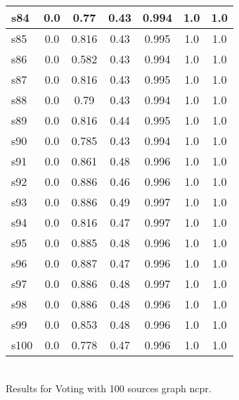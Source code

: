\documentclass{article}
\begin{document}
\begin{tabular}{|l|c|c|c|c|c|c|}
\hline
s84 &0.0 & 0.77 & 0.43 & 0.994 & 1.0 & 1.0\\
\hline
s85 &0.0 & 0.816 & 0.43 & 0.995 & 1.0 & 1.0\\
\hline
s86 &0.0 & 0.582 & 0.43 & 0.994 & 1.0 & 1.0\\
\hline
s87 &0.0 & 0.816 & 0.43 & 0.995 & 1.0 & 1.0\\
\hline
s88 &0.0 & 0.79 & 0.43 & 0.994 & 1.0 & 1.0\\
\hline
s89 &0.0 & 0.816 & 0.44 & 0.995 & 1.0 & 1.0\\
\hline
s90 &0.0 & 0.785 & 0.43 & 0.994 & 1.0 & 1.0\\
\hline
s91 &0.0 & 0.861 & 0.48 & 0.996 & 1.0 & 1.0\\
\hline
s92 &0.0 & 0.886 & 0.46 & 0.996 & 1.0 & 1.0\\
\hline
s93 &0.0 & 0.886 & 0.49 & 0.997 & 1.0 & 1.0\\
\hline
s94 &0.0 & 0.816 & 0.47 & 0.997 & 1.0 & 1.0\\
\hline
s95 &0.0 & 0.885 & 0.48 & 0.996 & 1.0 & 1.0\\
\hline
s96 &0.0 & 0.887 & 0.47 & 0.996 & 1.0 & 1.0\\
\hline
s97 &0.0 & 0.886 & 0.48 & 0.997 & 1.0 & 1.0\\
\hline
s98 &0.0 & 0.886 & 0.48 & 0.996 & 1.0 & 1.0\\
\hline
s99 &0.0 & 0.853 & 0.48 & 0.996 & 1.0 & 1.0\\
\hline
s100 &0.0 & 0.778 & 0.47 & 0.996 & 1.0 & 1.0\\
\hline
\end{tabular}\\

\noindent Results for Voting with 100 sources graph ncpr.
\end{document}
